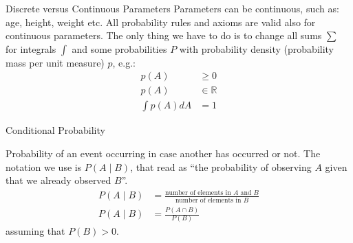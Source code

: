 \begin{frame}{Discrete versus Continuous Parameters}
	Parameters can be continuous, such as: age, height, weight etc.
	\vfill
	All probability rules and axioms are valid also for continuous parameters.
	\vfill
	The only thing we have to do is to change all sums $\sum$ for integrals $\int$ and some probabilities $P$ with probability density (probability mass per unit measure) $p$, e.g.:
	$$\begin{aligned}
	  p(A)         & \geq 0 \\
	  p(A)         & \in \mathbb{R} \\
	  \int p(A) dA & = 1
	\end{aligned}$$

\end{frame}


\begin{frame}{Conditional Probability}
	\begin{defn}
		Probability of an event occurring in case another has occurred or not. \newline \newline
		The notation we use is $P( A \mid B )$, that read as ``the probability of
		observing $A$ given that we already observed $B$''. \newline \newline
		$$
			\begin{aligned}
				P(A \mid B) & = \frac{\text{number of elements in $A$ and $B$}}{\text{number of elements in $B$}} \\
				P(A \mid B) & = \frac{P(A \cap B)}{P(B)}
			\end{aligned}
		$$
		\newline \hspace{0.7\textwidth}
		{\footnotesize assuming that $P(B) > 0$}.
	\end{defn}
\end{frame}

